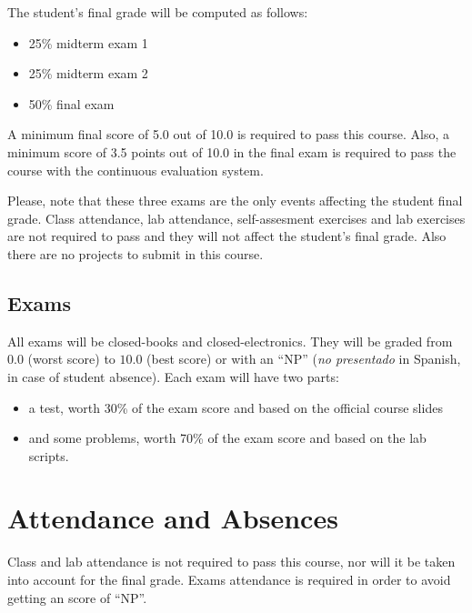 \documentclass[11pt, a4paper, twoside]{article}
\begin{document}
The student's final grade will be computed as follows:

\begin{itemize}

  \item 25\% midterm exam 1

  \item 25\% midterm exam 2

  \item 50\% final exam

\end{itemize}

A minimum final score of 5.0 out of 10.0 is required to pass this course. Also,
a minimum score of 3.5 points out of 10.0 in the final exam is required to pass
the course with the continuous evaluation system.

Please, note that these three exams are the only events affecting the student
final grade. Class attendance, lab attendance, self-assesment exercises and lab
exercises are not required to pass and they will not affect the student's final
grade. Also there are no projects to submit in this course.

\subsection{Exams}

All exams will be closed-books and closed-electronics. They will be graded from
$0.0$ (worst score) to $10.0$ (best score) or with an ``NP'' (\emph{no
presentado} in Spanish, in case of student absence). Each exam will have two
parts:

\begin{itemize}

  \item a test, worth 30\% of the exam score and based on the official course
    slides

  \item and some problems, worth 70\% of the exam score and based on the lab
    scripts.

\end{itemize}

\section{Attendance and Absences}

Class and lab attendance is not required to pass this course, nor will it be
taken into account for the final grade. Exams attendance is required in order to avoid getting an score of ``NP''.
\end{document}

